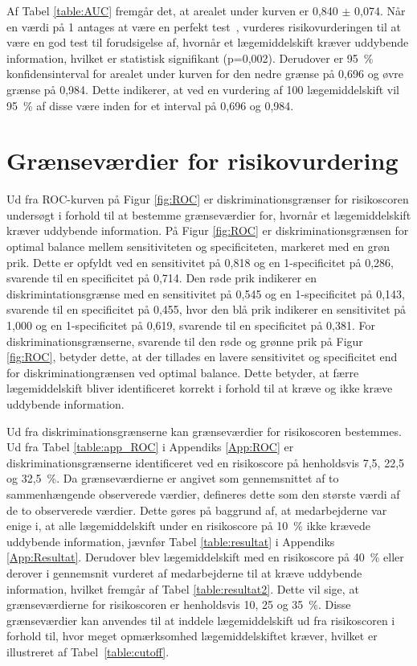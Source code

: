 Af Tabel \ref{table:AUC} fremgår det, at arealet under kurven er 0,840 $\pm$ 0,074. Når en værdi på 1 antages at være en perfekt test~\citep{Greiner2000}, vurderes risikovurderingen til at være en god test til forudsigelse af, hvornår et lægemiddelskift kræver uddybende information, hvilket er statistisk signifikant (p=0,002). Derudover er 95~\% konfidensinterval for arealet under kurven for den nedre grænse på 0,696 og øvre grænse på 0,984. Dette indikerer, at ved en vurdering af 100 lægemiddelskift vil 95~\% af disse være inden for et interval på 0,696 og 0,984.

\section{Grænseværdier for risikovurdering}
Ud fra ROC-kurven på Figur \ref{fig:ROC}  er diskriminationsgrænser for risikoscoren undersøgt i forhold til at bestemme grænseværdier for, hvornår et lægemiddelskift kræver uddybende information. På Figur \ref{fig:ROC} er diskriminationsgrænsen for optimal balance mellem sensitiviteten og specificiteten, markeret med en grøn prik. Dette er opfyldt ved en sensitivitet på 0,818 og en 1-specificitet på 0,286, svarende til en specificitet på 0,714. Den røde prik indikerer en diskrimintationsgrænse med en sensitivitet på 0,545 og en 1-specificitet på 0,143, svarende til en specificitet på 0,455, hvor den blå prik indikerer en sensitivitet på 1,000 og en 1-specificitet på 0,619, svarende til en specificitet på 0,381. For diskriminationsgrænserne, svarende til den røde og grønne prik på Figur \ref{fig:ROC}, betyder dette, at der tillades en lavere sensitivitet og specificitet end for diskriminationgrænsen ved optimal balance. Dette betyder, at færre lægemiddelskift bliver identificeret korrekt i forhold til at kræve og ikke kræve uddybende information.


Ud fra diskriminationsgrænserne kan grænseværdier for risikoscoren bestemmes. Ud fra Tabel \ref{table:app_ROC} i Appendiks \ref{App:ROC} er diskriminationsgrænserne identificeret ved en risikoscore på  henholdsvis 7,5, 22,5 og 32,5~\%. Da grænseværdierne er angivet som gennemsnittet af to sammenhængende observerede værdier, defineres dette som den største værdi af de to observerede værdier. Dette gøres på baggrund af, at medarbejderne var enige i, at alle lægemiddelskift under en risikoscore på 10~\% ikke krævede uddybende information, jævnfør Tabel \ref{table:resultat} i Appendiks \ref{App:Resultat}. Derudover blev
lægemiddelskift med en risikoscore på 40~\% eller derover i gennemsnit vurderet af medarbejderne til at kræve uddybende information, hvilket fremgår af Tabel \ref{table:resultat2}. Dette vil sige, at grænseværdierne for risikoscoren er henholdsvis 10, 25 og 35~\%. Disse grænseværdier kan anvendes til at inddele lægemiddelskift ud fra risikoscoren i forhold til, hvor meget opmærksomhed lægemiddelskiftet kræver, hvilket er illustreret af Tabel~\ref{table:cutoff}.

